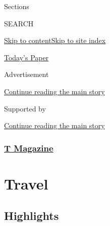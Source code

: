 Sections

SEARCH

\protect\hyperlink{site-content}{Skip to
content}\protect\hyperlink{site-index}{Skip to site index}

\href{https://myaccount.nytimes.com/auth/login?response_type=cookie\&client_id=vi}{}

\href{https://www.nytimes.com/section/todayspaper}{Today's Paper}

Advertisement

\protect\hyperlink{after-top}{Continue reading the main story}

Supported by

\protect\hyperlink{after-sponsor}{Continue reading the main story}

\hypertarget{t-magazine}{%
\subsubsection{\texorpdfstring{\href{/section/t-magazine}{T
Magazine}}{T Magazine}}\label{t-magazine}}

\hypertarget{travel}{%
\section{Travel}\label{travel}}

\hypertarget{highlights}{%
\subsection{Highlights}\label{highlights}}

